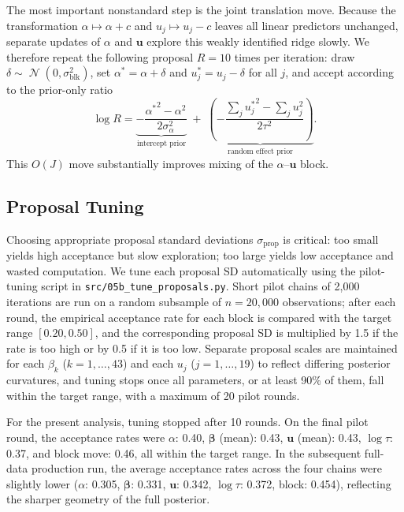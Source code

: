 \documentclass[10pt]{article}
\newcommand{\bbeta}{\bm{\beta}}
\newcommand{\bu}{\bm{u}}
\DeclareMathOperator{\Normal}{\mathcal{N}}
\begin{document}
The most important nonstandard step is the joint translation move. Because the
transformation $\alpha \mapsto \alpha + c$ and $u_j \mapsto u_j - c$ leaves
all linear predictors unchanged, separate updates of $\alpha$ and $\bu$
explore this weakly identified ridge slowly. We therefore repeat the following
proposal $R = 10$ times per iteration: draw
$\delta \sim \Normal(0, \sigma_{\text{blk}}^2)$, set
$\alpha^* = \alpha + \delta$ and $u_j^* = u_j - \delta$ for all $j$, and
accept according to the prior-only ratio
\begin{equation}\label{eq:block5-ratio}
  \log R
  = \underbrace{-\frac{{\alpha^*}^2 - \alpha^2}{2\sigma_\alpha^2}}_{\text{intercept prior}}
  \;+\; \underbrace{\left(-\frac{\sum_j {u_j^*}^2 - \sum_j u_j^2}{2\tau^2}\right)}_{\text{random effect prior}}.
\end{equation}
This $O(J)$ move substantially improves mixing of the $\alpha$--$\bu$ block.

\subsection{Proposal Tuning}

Choosing appropriate proposal standard deviations $\sigma_{\text{prop}}$ is
critical: too small yields high acceptance but slow exploration; too large
yields low acceptance and wasted computation.  We tune each proposal SD
automatically using the pilot-tuning script in
\texttt{src/05b\_tune\_proposals.py}. Short pilot chains of 2,000 iterations
are run on a random subsample of $n = 20{,}000$ observations; after each
round, the empirical acceptance rate for each block is compared with the
target range $[0.20, 0.50]$, and the corresponding proposal SD is multiplied
by 1.5 if the rate is too high or by 0.5 if it is too low. Separate proposal
scales are maintained for each $\beta_k$ ($k = 1,\dots,43$) and each $u_j$
($j = 1,\dots,19$) to reflect differing posterior curvatures, and tuning stops
once all parameters, or at least 90\% of them, fall within the target range,
with a maximum of 20 pilot rounds.

For the present analysis, tuning stopped after 10 rounds. On the final pilot
round, the acceptance rates were $\alpha$: 0.40, $\bbeta$ (mean): 0.43,
$\bu$ (mean): 0.43, $\log\tau$: 0.37, and block move: 0.46, all within the
target range. In the subsequent full-data production run, the average
acceptance rates across the four chains were slightly lower
($\alpha$: 0.305, $\bbeta$: 0.331, $\bu$: 0.342, $\log\tau$: 0.372, block:
0.454), reflecting the sharper geometry of the full posterior.
\end{document}
